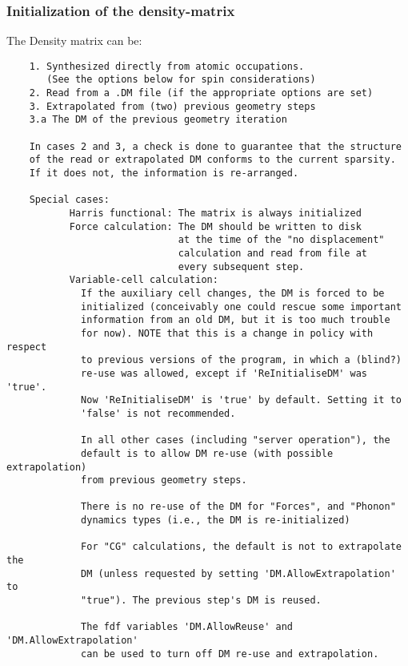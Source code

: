 \documentclass[11pt]{article}
\begin{document}
\subsubsection{Initialization of the density-matrix}

The Density matrix can be:

\begin{verbatim}
    1. Synthesized directly from atomic occupations.
       (See the options below for spin considerations)
    2. Read from a .DM file (if the appropriate options are set)
    3. Extrapolated from (two) previous geometry steps
    3.a The DM of the previous geometry iteration

    In cases 2 and 3, a check is done to guarantee that the structure
    of the read or extrapolated DM conforms to the current sparsity.
    If it does not, the information is re-arranged.

    Special cases:
           Harris functional: The matrix is always initialized
           Force calculation: The DM should be written to disk
                              at the time of the "no displacement"
                              calculation and read from file at
                              every subsequent step.
           Variable-cell calculation:
             If the auxiliary cell changes, the DM is forced to be
             initialized (conceivably one could rescue some important
             information from an old DM, but it is too much trouble
             for now). NOTE that this is a change in policy with respect
             to previous versions of the program, in which a (blind?)
             re-use was allowed, except if 'ReInitialiseDM' was 'true'.
             Now 'ReInitialiseDM' is 'true' by default. Setting it to
             'false' is not recommended.

             In all other cases (including "server operation"), the
             default is to allow DM re-use (with possible extrapolation)
             from previous geometry steps.

             There is no re-use of the DM for "Forces", and "Phonon"
             dynamics types (i.e., the DM is re-initialized)

             For "CG" calculations, the default is not to extrapolate the
             DM (unless requested by setting 'DM.AllowExtrapolation' to
             "true"). The previous step's DM is reused.

             The fdf variables 'DM.AllowReuse' and 'DM.AllowExtrapolation'
             can be used to turn off DM re-use and extrapolation.

\end{verbatim}
\end{document}
